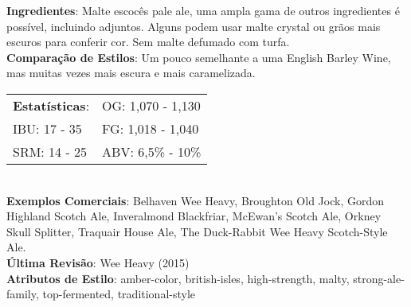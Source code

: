 \textbf{Ingredientes}: Malte escocês pale ale, uma ampla gama de outros ingredientes é possível, incluindo adjuntos. Alguns podem usar malte crystal ou grãos mais escuros para conferir cor. Sem malte defumado com turfa. \\
\textbf{Comparação de Estilos}: Um pouco semelhante a uma English Barley Wine, mas muitas vezes mais escura e mais caramelizada. \\
\begin{tabular}{@{}p{35mm}p{35mm}@{}}
  \textbf{Estatísticas}: & OG: 1,070 - 1,130 \\
  IBU: 17 - 35  & FG: 1,018 - 1,040  \\
  SRM: 14 - 25  & ABV: 6,5\% - 10\%
\end{tabular}\\
\textbf{Exemplos Comerciais}: Belhaven Wee Heavy, Broughton Old Jock, Gordon Highland Scotch Ale, Inveralmond Blackfriar, McEwan's Scotch Ale, Orkney Skull Splitter, Traquair House Ale, The Duck-Rabbit Wee Heavy Scotch-Style Ale. \\
\textbf{Última Revisão}: Wee Heavy (2015) \\
\textbf{Atributos de Estilo}: amber-color, british-isles, high-strength, malty, strong-ale-family, top-fermented, traditional-style
